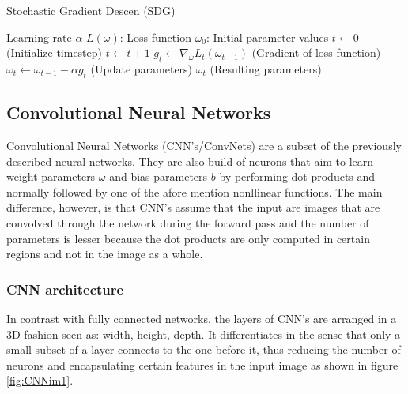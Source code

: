 \begin{itemize}
\begin{algorithm}
\caption{Stochastic Gradient Descen (SDG)}
\label{SDGalg}
\begin{algorithmic}[1]
    \Require  Learning rate $\alpha  $ 
    \Require $L ( \omega ) $: Loss function
    \Require $ \omega_0 $: Initial parameter values
    \State $t \leftarrow 0$ (Initialize timestep)
        \State $t \leftarrow t+1$ 
        \State $g_t \leftarrow \nabla_{\omega} L_t ( \omega_{t-1} )$ (Gradient of loss function) 
        \State $\omega_t \leftarrow \omega_{t-1} - \alpha g_t $ (Update parameters)
    \EndWhile
    \State \Return $\omega_t $ (Resulting parameters)   
\end{algorithmic}
\end{algorithm}

\end{itemize} 



\subsection{Convolutional Neural Networks}
Convolutional Neural Networks (CNN's/ConvNets) are a subset of the previously described neural networks. They are also build of neurons that aim to learn weight parameters $\omega$ and bias parameters $b$ by performing dot products and normally followed by one of the afore mention nonllinear functions. The main difference, however, is that CNN's assume that the input are images that are convolved through the network during the forward pass and the number of parameters is lesser because the dot products are only computed in certain regions and not in the image as a whole.   

\subsubsection{CNN architecture}
In contrast with fully connected networks, the layers of CNN's are arranged in a 3D fashion seen as: width, height, depth. It differentiates in the sense that only a small subset of a layer connects to the one before it, thus reducing the number of neurons and encapsulating certain features in the input image as shown in  figure \ref{fig:CNNim1}. \

